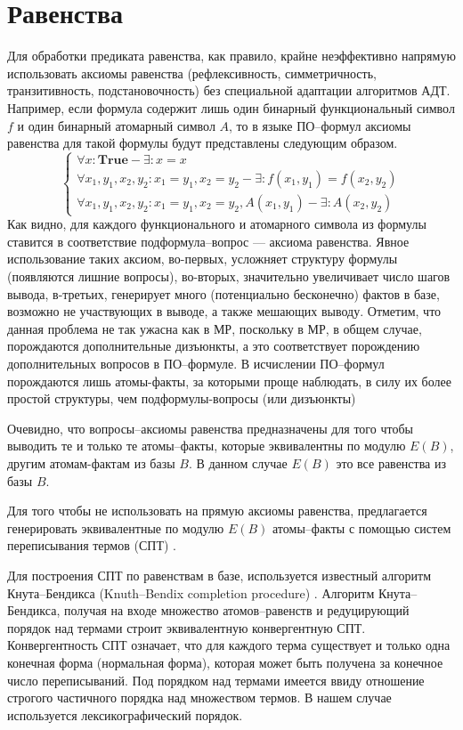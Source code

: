 \section{Равенства}
Для обработки предиката равенства, как правило, крайне неэффективно напрямую использовать аксиомы равенства (рефлексивность, симметричность, транзитивность, подстановочность) без специальной адаптации алгоритмов АДТ. Например, если формула содержит лишь один бинарный функциональный символ $f$ и один бинарный атомарный символ $A$, то в языке ПО--формул аксиомы равенства для такой формулы будут представлены следующим образом.
$$\left\lbrace
\begin{array}{l}
\forall x\colon\boldsymbol{True} - \exists\colon x = x \\
\forall x_1,y_1,x_2,y_2\colon x_1 = y_1, x_2 = y_2 - \exists\colon f(x_1,y_1) = f(x_2, y_2) \\
\forall x_1,y_1,x_2,y_2\colon x_1 = y_1, x_2 = y_2, A(x_1,y_1) - \exists\colon A(x_2,y_2)
\end{array}\right.
$$
Как видно, для каждого функционального и атомарного символа из формулы ставится в соответствие подформула--вопрос --- аксиома равенства. Явное использование таких аксиом, во-первых, усложняет структуру формулы (появляются лишние вопросы), во-вторых, значительно увеличивает число шагов вывода, в-третьих, генерирует много (потенциально бесконечно) фактов в базе, возможно не участвующих в выводе, а также мешающих выводу. Отметим, что данная проблема не так ужасна как в МР, поскольку в МР, в общем случае,  порождаются дополнительные дизъюнкты, а это соответствует порождению дополнительных вопросов в ПО--формуле. В исчислении ПО--формул порождаются лишь атомы-факты, за которыми проще наблюдать, в силу их более простой структуры, чем подформулы-вопросы (или дизъюнкты)

Очевидно, что вопросы--аксиомы равенства предназначены для того чтобы выводить те и только те атомы--факты, которые эквивалентны по модулю $E(B)$, другим атомам-фактам из базы $B$. В данном случае $E(B)$ это все равенства из базы $B$.

Для того чтобы не использовать на прямую аксиомы равенства, предлагается генерировать эквивалентные по модулю $E(B)$ атомы--факты с помощью систем переписывания термов (СПТ) \cite{Nipkow}.

Для построения СПТ по равенствам в базе, используется известный алгоритм Кнута--Бендикса (Knuth--Bendix completion procedure) \cite{KBAlg}. Алгоритм Кнута--Бендикса, получая на входе множество атомов--равенств и редуцирующий порядок над термами \cite{Nipkow} строит эквивалентную конвергентную СПТ. Конвергентность СПТ означает, что для каждого терма существует и только одна конечная форма (нормальная форма), которая может быть получена за конечное число переписываний. Под порядком над термами имеется ввиду отношение строгого частичного порядка над множеством термов. В нашем случае используется лексикографический порядок.

